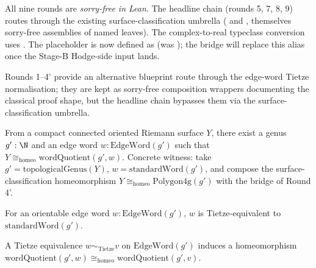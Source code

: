 All nine rounds are \emph{sorry-free in Lean}.  The headline
chain (rounds 5, 7, 8, 9) routes through the existing
surface-classification umbrella ( and
,
themselves sorry-free assemblies of named leaves).  The complex-to-real
typeclass conversion uses
.  The placeholder
 is now defined as
 (was ); the  bridge will replace this
alias once the Stage-B Hodge-side input lands.

Rounds 1--4' provide an alternative blueprint route through the
edge-word Tietze normalisation; they are kept as sorry-free
composition wrappers documenting the classical proof shape, but the
headline chain bypasses them via the surface-classification
umbrella.

\begin{lemma}
\label{lem:polygonal-model-phase12-word-quotient}
From a compact connected oriented Riemann surface $Y$, there exist a
genus $g' : \N$ and an edge word $w : \mathrm{EdgeWord}(g')$ such
that $Y \cong_{\mathrm{homeo}} \mathrm{wordQuotient}(g', w)$.
Concrete witness: take $g' = \mathrm{topologicalGenus}(Y)$,
$w = \mathrm{standardWord}(g')$, and compose the surface-classification
homeomorphism $Y \cong_{\mathrm{homeo}} \mathrm{Polygon4g}(g')$ with
the bridge of Round 4'.
\leanok
\end{lemma}

\begin{lemma}
\label{lem:polygonal-model-phase3-tietze-normal-form}
For an orientable edge word $w : \mathrm{EdgeWord}(g')$, $w$ is
Tietze-equivalent to $\mathrm{standardWord}(g')$.
\leanok
\end{lemma}

\begin{lemma}
\label{lem:polygonal-model-phase3-quotient-lift}
A Tietze equivalence $w \sim_{\mathrm{Tietze}} v$ on
$\mathrm{EdgeWord}(g')$ induces a homeomorphism
$\mathrm{wordQuotient}(g', w) \cong_{\mathrm{homeo}} \mathrm{wordQuotient}(g', v)$.
\leanok
\end{lemma}

